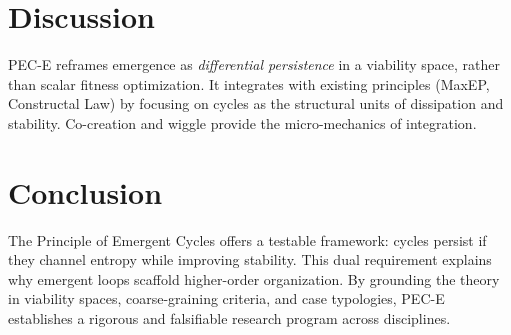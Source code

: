 \documentclass[12pt,a4paper]{article}
\begin{document}
\section{Discussion}
PEC-E reframes emergence as \emph{differential persistence} in a viability space, rather than scalar fitness optimization. It integrates with existing principles (MaxEP, Constructal Law) by focusing on cycles as the structural units of dissipation and stability. Co-creation and wiggle provide the micro-mechanics of integration.

\section{Conclusion}
The Principle of Emergent Cycles offers a testable framework: cycles persist if they channel entropy while improving stability. This dual requirement explains why emergent loops scaffold higher-order organization. By grounding the theory in viability spaces, coarse-graining criteria, and case typologies, PEC-E establishes a rigorous and falsifiable research program across disciplines.



\end{document}
